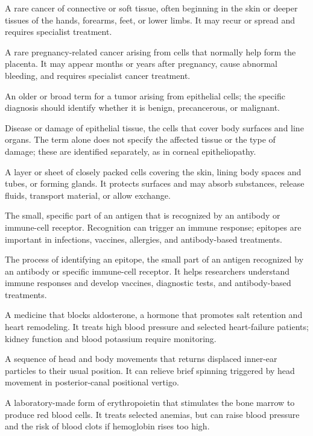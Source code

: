  A rare cancer of connective or soft tissue, often beginning in the skin or deeper tissues of the hands, forearms, feet, or lower limbs. It may recur or spread and requires specialist treatment.

 A rare pregnancy-related cancer arising from cells that normally help form the placenta. It may appear months or years after pregnancy, cause abnormal bleeding, and requires specialist cancer treatment.

 An older or broad term for a tumor arising from epithelial cells; the specific diagnosis should identify whether it is benign, precancerous, or malignant.

 Disease or damage of epithelial tissue, the cells that cover body surfaces and line organs. The term alone does not specify the affected tissue or the type of damage; these are identified separately, as in corneal epitheliopathy.

 A layer or sheet of closely packed cells covering the skin, lining body spaces and tubes, or forming glands. It protects surfaces and may absorb substances, release fluids, transport material, or allow exchange.

 The small, specific part of an antigen that is recognized by an antibody or immune-cell receptor. Recognition can trigger an immune response; epitopes are important in infections, vaccines, allergies, and antibody-based treatments.

 The process of identifying an epitope, the small part of an antigen recognized by an antibody or specific immune-cell receptor. It helps researchers understand immune responses and develop vaccines, diagnostic tests, and antibody-based treatments.

 A medicine that blocks aldosterone, a hormone that promotes salt retention and heart remodeling. It treats high blood pressure and selected heart-failure patients; kidney function and blood potassium require monitoring.

 A sequence of head and body movements that returns displaced inner-ear particles to their usual position. It can relieve brief spinning triggered by head movement in posterior-canal positional vertigo.

 A laboratory-made form of erythropoietin that stimulates the bone marrow to produce red blood cells. It treats selected anemias, but can raise blood pressure and the risk of blood clots if hemoglobin rises too high.

